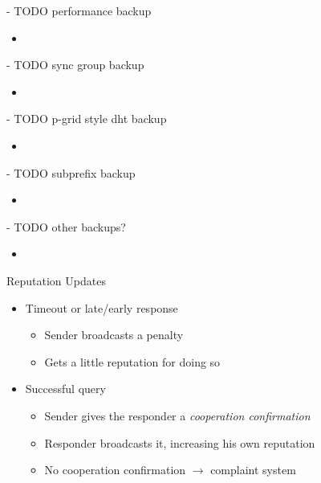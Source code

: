 \documentclass[presentation,english,usenames,dvipsnames]{beamer}
\begin{document}
\begin{frame}
\end{frame}

\begin{frame}
- TODO performance backup
  \begin{itemize}
    \item
  \end{itemize}
\end{frame}

\begin{frame}
- TODO sync group backup
  \begin{itemize}
    \item
  \end{itemize}
\end{frame}

\begin{frame}
- TODO p-grid style dht backup
  \begin{itemize}
    \item
  \end{itemize}
\end{frame}

\begin{frame}
- TODO subprefix backup
  \begin{itemize}
    \item
  \end{itemize}
\end{frame}

\begin{frame}
- TODO other backups?
  \begin{itemize}
    \item
  \end{itemize}
\end{frame}

\begin{frame}{Reputation Updates}
  \begin{itemize}
    \item Timeout or late/early response
    \begin{itemize}
      \item Sender broadcasts a penalty
      \item Gets a little reputation for doing so
    \end{itemize}
    \item Successful query
    \begin{itemize}
      \item Sender gives the responder a \emph{cooperation confirmation}
      \item Responder broadcasts it, increasing his own reputation
      \item No cooperation confirmation $\rightarrow$ complaint system
    \end{itemize}
  \end{itemize}
\end{frame}
\end{document}
